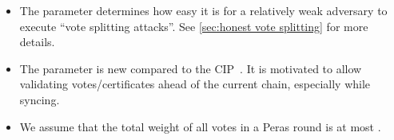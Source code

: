 \begin{itemize}
\item
  The parameter \perasBlockMinSlots{} determines how easy it is for a relatively weak adversary to execute \enquote{vote splitting attacks}.
  See \cref{sec:honest vote splitting} for more details.
\item
  The parameter \perasBlockMaxSlots{} is new compared to the CIP~\cite{peras-cip}.
  It is motivated to allow validating votes/certificates ahead of the current chain, especially while syncing.
\item
  We assume that the total weight of all votes in a Peras round is at most \perasN{}.
\end{itemize}



